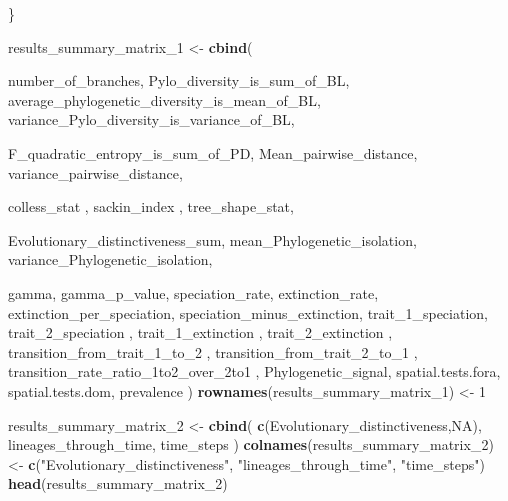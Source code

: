 \documentclass[]{book}
\newenvironment{Shaded}{\begin{snugshade}}{\end{snugshade}}
\newcommand{\KeywordTok}[1]{\textcolor[rgb]{0.13,0.29,0.53}{\textbf{{#1}}}}
\newcommand{\DecValTok}[1]{\textcolor[rgb]{0.00,0.00,0.81}{{#1}}}
\newcommand{\StringTok}[1]{\textcolor[rgb]{0.31,0.60,0.02}{{#1}}}
\newcommand{\OtherTok}[1]{\textcolor[rgb]{0.56,0.35,0.01}{{#1}}}
\newcommand{\NormalTok}[1]{{#1}}
\theoremstyle{definition}
\theoremstyle{definition}
\theoremstyle{definition}
\theoremstyle{remark}
\begin{document}
\begin{Shaded}
\begin{Highlighting}[]
{\NormalTok{    \}}

\NormalTok{    results_summary_matrix_}\DecValTok{1}\NormalTok{ <-}\StringTok{ }\KeywordTok{cbind}\NormalTok{(}

\NormalTok{      number_of_branches,}
\NormalTok{      Pylo_diversity_is_sum_of_BL,}
\NormalTok{      average_phylogenetic_diversity_is_mean_of_BL,}
\NormalTok{      variance_Pylo_diversity_is_variance_of_BL,}

\NormalTok{      F_quadratic_entropy_is_sum_of_PD,}
\NormalTok{      Mean_pairwise_distance,}
\NormalTok{      variance_pairwise_distance,}

\NormalTok{      colless_stat ,}
\NormalTok{      sackin_index ,}
\NormalTok{      tree_shape_stat,}

\NormalTok{      Evolutionary_distinctiveness_sum,}
\NormalTok{      mean_Phylogenetic_isolation,}
\NormalTok{      variance_Phylogenetic_isolation,}

\NormalTok{      gamma,}
\NormalTok{      gamma_p_value,}
\NormalTok{      speciation_rate,}
\NormalTok{      extinction_rate,}
\NormalTok{      extinction_per_speciation,}
\NormalTok{      speciation_minus_extinction,}
\NormalTok{      trait_1_speciation,}
\NormalTok{      trait_2_speciation ,}
\NormalTok{      trait_1_extinction ,}
\NormalTok{      trait_2_extinction ,}
\NormalTok{      transition_from_trait_1_to_}\DecValTok{2}\NormalTok{ ,}
\NormalTok{      transition_from_trait_2_to_}\DecValTok{1}\NormalTok{ ,}
\NormalTok{      transition_rate_ratio_1to2_over_2to1 ,}
\NormalTok{      Phylogenetic_signal,}
\NormalTok{      spatial.tests.fora,}
\NormalTok{      spatial.tests.dom,}
\NormalTok{      prevalence}
\NormalTok{    )}
    \KeywordTok{rownames}\NormalTok{(results_summary_matrix_}\DecValTok{1}\NormalTok{) <-}\StringTok{ }\DecValTok{1}

\NormalTok{    results_summary_matrix_}\DecValTok{2}\NormalTok{ <-}\StringTok{ }\KeywordTok{cbind}\NormalTok{(}
      \KeywordTok{c}\NormalTok{(Evolutionary_distinctiveness,}\OtherTok{NA}\NormalTok{),}
\NormalTok{      lineages_through_time,}
\NormalTok{      time_steps}
\NormalTok{    )}
    \KeywordTok{colnames}\NormalTok{(results_summary_matrix_}\DecValTok{2}\NormalTok{) <-}\StringTok{ }\KeywordTok{c}\NormalTok{(}\StringTok{"Evolutionary_distinctiveness"}\NormalTok{,}
                                            \StringTok{"lineages_through_time"}\NormalTok{, }\StringTok{"time_steps"}\NormalTok{)}
    \KeywordTok{head}\NormalTok{(results_summary_matrix_}\DecValTok{2}\NormalTok{)}

}
\end{Highlighting}
\end{Shaded}
\end{document}
